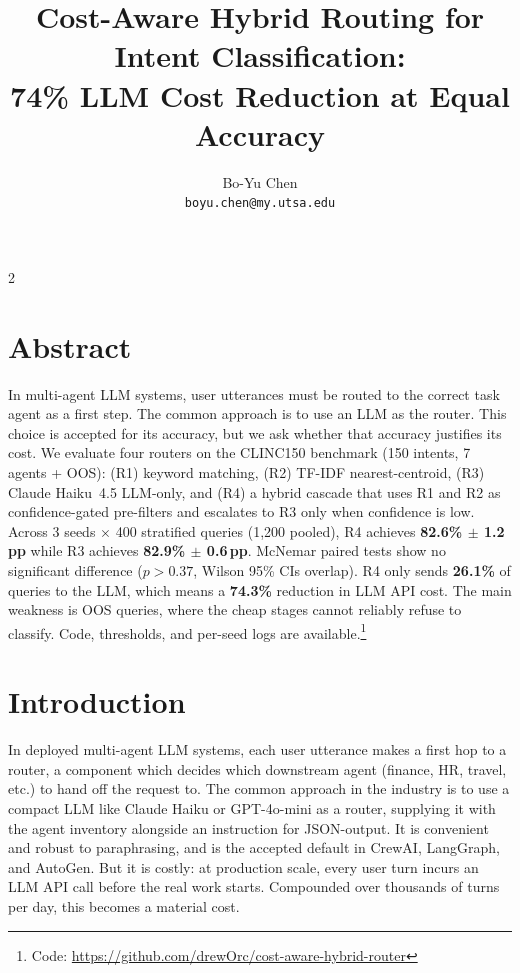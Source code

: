 \documentclass[11pt,a4paper]{article}
\title{\textbf{Cost-Aware Hybrid Routing for Intent Classification:\\74\% LLM Cost Reduction at Equal Accuracy}}
\author{
  Bo-Yu Chen\\
  \texttt{boyu.chen@my.utsa.edu}
}
\date{}
\begin{document}
\maketitle
\begin{multicols}{2}

\section*{Abstract}

In multi-agent LLM systems, user utterances must be routed to the correct task agent as a first step. The common approach is to use an LLM as the router. This choice is accepted for its accuracy, but we ask whether that accuracy justifies its cost. We evaluate four routers on the CLINC150 benchmark (150 intents, 7 agents + OOS): (R1) keyword matching, (R2) TF-IDF nearest-centroid, (R3) Claude Haiku~4.5 LLM-only, and (R4) a hybrid cascade that uses R1 and R2 as confidence-gated pre-filters and escalates to R3 only when confidence is low. Across 3 seeds $\times$ 400 stratified queries (1,200 pooled), R4 achieves \textbf{82.6\% $\pm$ 1.2\,pp} while R3 achieves \textbf{82.9\% $\pm$ 0.6\,pp}. McNemar paired tests show no significant difference ($p > 0.37$, Wilson 95\% CIs overlap). R4 only sends \textbf{26.1\%} of queries to the LLM, which means a \textbf{74.3\%} reduction in LLM API cost. The main weakness is OOS queries, where the cheap stages cannot reliably refuse to classify. Code, thresholds, and per-seed logs are available.\footnote{Code: \url{https://github.com/drewOrc/cost-aware-hybrid-router}}

\section{Introduction}

In deployed multi-agent LLM systems, each user utterance makes a first hop to a router, a component which decides which downstream agent (finance, HR, travel, etc.) to hand off the request to. The common approach in the industry is to use a compact LLM like Claude Haiku or GPT-4o-mini as a router, supplying it with the agent inventory alongside an instruction for JSON-output. It is convenient and robust to paraphrasing, and is the accepted default in CrewAI, LangGraph, and AutoGen. But it is costly: at production scale, every user turn incurs an LLM API call before the real work starts. Compounded over thousands of turns per day, this becomes a material cost.


\end{multicols}
\end{document}
